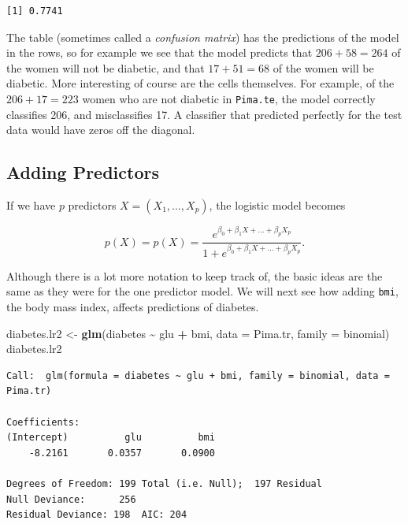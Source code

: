 \documentclass[
]{krantz}
\makeatletter
\newenvironment{Shaded}{\begin{snugshade}}{\end{snugshade}}
\newcommand{\DataTypeTok}[1]{\textcolor[rgb]{0.27,0.27,0.27}{#1}}
\newcommand{\KeywordTok}[1]{\textcolor[rgb]{0.27,0.27,0.27}{\textbf{#1}}}
\newcommand{\NormalTok}[1]{#1}
\newcommand{\OperatorTok}[1]{\textcolor[rgb]{0.43,0.43,0.43}{\textbf{#1}}}
\newcommand{\StringTok}[1]{\textcolor[rgb]{0.5,0.5,0.5}{#1}}
\newenvironment{kframe}{%
\medskip{}
\setlength{\fboxsep}{.8em}
 \def\at@end@of@kframe{}%
 \ifinner\ifhmode%
  \def\at@end@of@kframe{\end{minipage}}%
  \begin{minipage}{\columnwidth}%
 \fi\fi%
 \def\FrameCommand##1{\hskip\@totalleftmargin \hskip-\fboxsep
 \colorbox{shadecolor}{##1}\hskip-\fboxsep
     \hskip-\linewidth \hskip-\@totalleftmargin \hskip\columnwidth}%
 \MakeFramed {\advance\hsize-\width
   \@totalleftmargin\z@ \linewidth\hsize
   \@setminipage}}%
 {\par\unskip\endMakeFramed%
 \at@end@of@kframe}
\renewenvironment{Shaded}{\begin{kframe}}{\end{kframe}}
\makeatother
\begin{document}
\begin{verbatim}
[1] 0.7741
\end{verbatim}

The table (sometimes called a \emph{confusion matrix}) has the predictions of the model in the rows, so for example we see that the model predicts that \(206 + 58 = 264\) of the women will not be diabetic, and that \(17+51 = 68\) of the women will be diabetic. More interesting of course are the cells themselves. For example, of the \(206 + 17 = 223\) women who are not diabetic in \texttt{Pima.te}, the model correctly classifies 206, and misclassifies 17. A classifier that predicted perfectly for the test data would have zeros off the diagonal.

\hypertarget{adding-predictors}{%
\subsection{Adding Predictors}\label{adding-predictors}}

If we have \(p\) predictors \(X = (X_1, \dots, X_p)\), the logistic model becomes

\[
p(X) = p(X) = \frac{e^{\beta_0 + \beta_1 X + \dots + \beta_p X_p}}{1 + e^{\beta_0 + \beta_1 X + \dots + \beta_p X_p}}.
\]

Although there is a lot more notation to keep track of, the basic ideas are the same as they were for the one predictor model. We will next see how adding \texttt{bmi}, the body mass index, affects predictions of diabetes.

\begin{Shaded}
\begin{Highlighting}[]
\NormalTok{diabetes.lr2 \textless{}{-}}\StringTok{ }\KeywordTok{glm}\NormalTok{(diabetes }\OperatorTok{\textasciitilde{}}\StringTok{ }\NormalTok{glu }\OperatorTok{+}\StringTok{ }\NormalTok{bmi, }
                    \DataTypeTok{data =}\NormalTok{ Pima.tr, }\DataTypeTok{family =}\NormalTok{ binomial)}
\NormalTok{diabetes.lr2}
\end{Highlighting}
\end{Shaded}

\begin{verbatim}
Call:  glm(formula = diabetes ~ glu + bmi, family = binomial, data = Pima.tr)

Coefficients:
(Intercept)          glu          bmi  
    -8.2161       0.0357       0.0900  

Degrees of Freedom: 199 Total (i.e. Null);  197 Residual
Null Deviance:	    256 
Residual Deviance: 198 	AIC: 204
\end{verbatim}
\end{document}
